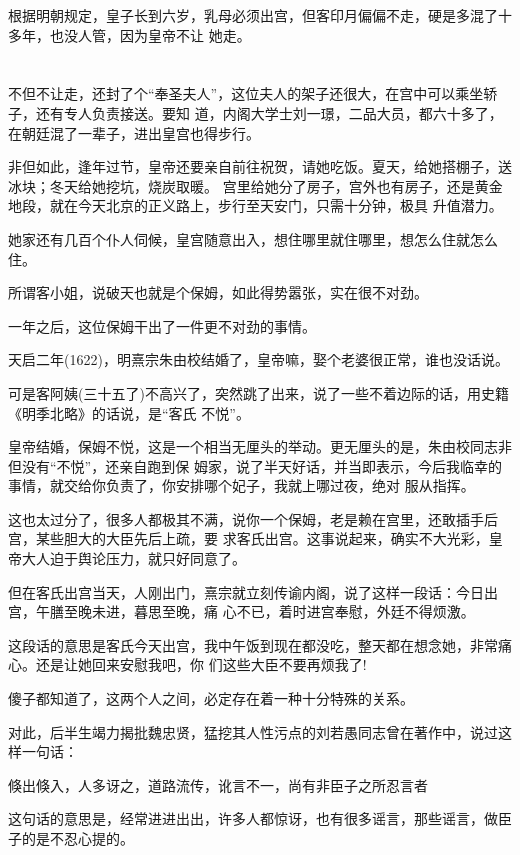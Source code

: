 \documentclass[11pt,a4paper,onecolumn]{article}
\begin{document}
根据明朝规定，皇子长到六岁，乳母必须出宫，但客印月偏偏不走，硬是多混了十多年，也没人管，因为皇帝不让
她走。

\section[\thesection]{}

不但不让走，还封了个``奉圣夫人''，这位夫人的架子还很大，在宫中可以乘坐轿子，还有专人负责接送。要知
道，内阁大学士刘一璟，二品大员，都六十多了，在朝廷混了一辈子，进出皇宫也得步行。

非但如此，逢年过节，皇帝还要亲自前往祝贺，请她吃饭。夏天，给她搭棚子，送冰块；冬天给她挖坑，烧炭取暖。
宫里给她分了房子，宫外也有房子，还是黄金地段，就在今天北京的正义路上，步行至天安门，只需十分钟，极具
升值潜力。

她家还有几百个仆人伺候，皇宫随意出入，想住哪里就住哪里，想怎么住就怎么住。

所谓客小姐，说破天也就是个保姆，如此得势嚣张，实在很不对劲。

一年之后，这位保姆干出了一件更不对劲的事情。

天启二年(1622)，明熹宗朱由校结婚了，皇帝嘛，娶个老婆很正常，谁也没话说。

可是客阿姨(三十五了)不高兴了，突然跳了出来，说了一些不着边际的话，用史籍《明季北略》的话说，是``客氏
不悦''。

皇帝结婚，保姆不悦，这是一个相当无厘头的举动。更无厘头的是，朱由校同志非但没有``不悦''，还亲自跑到保
姆家，说了半天好话，并当即表示，今后我临幸的事情，就交给你负责了，你安排哪个妃子，我就上哪过夜，绝对
服从指挥。

这也太过分了，很多人都极其不满，说你一个保姆，老是赖在宫里，还敢插手后宫，某些胆大的大臣先后上疏，要
求客氏出宫。这事说起来，确实不大光彩，皇帝大人迫于舆论压力，就只好同意了。

但在客氏出宫当天，人刚出门，熹宗就立刻传谕内阁，说了这样一段话：今日出宫，午膳至晚未进，暮思至晚，痛
心不已，着时进宫奉慰，外廷不得烦激。

这段话的意思是客氏今天出宫，我中午饭到现在都没吃，整天都在想念她，非常痛心。还是让她回来安慰我吧，你
们这些大臣不要再烦我了!

傻子都知道了，这两个人之间，必定存在着一种十分特殊的关系。

对此，后半生竭力揭批魏忠贤，猛挖其人性污点的刘若愚同志曾在著作中，说过这样一句话：

倏出倏入，人多讶之，道路流传，讹言不一，尚有非臣子之所忍言者

这句话的意思是，经常进进出出，许多人都惊讶，也有很多谣言，那些谣言，做臣子的是不忍心提的。
\end{document}
